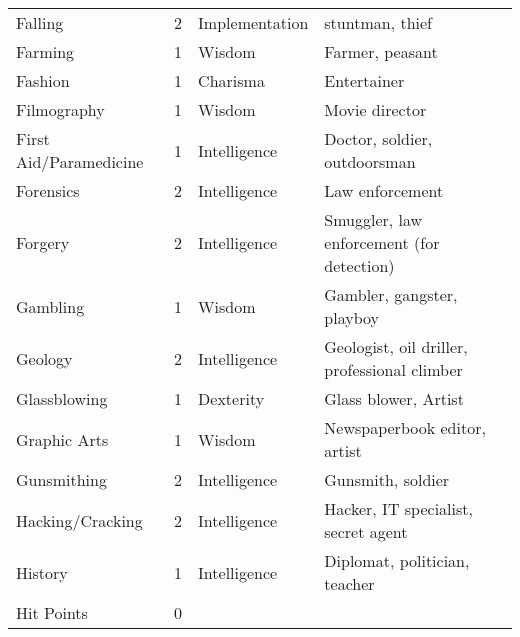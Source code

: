 \documentclass[twoside]{book}
\begin{document}
\begin{longtable}{p{1.25in}llp{12em}}
  \tabularnewline
      
  \raggedright
           Falling 
  &
   2 
  &
   Implementation 
  &
   stuntman, thief 
  \tabularnewline
      
  \raggedright
           Farming 
  &
   1 
  &
   Wisdom 
  &
   Farmer, peasant 
  \tabularnewline
      
  \raggedright
           Fashion 
  &
   1 
  &
   Charisma 
  &
   Entertainer 
  \tabularnewline
      
  \raggedright
           Filmography 
  &
   1 
  &
   Wisdom 
  &
   Movie director 
  \tabularnewline
      
  \raggedright
           First Aid/Paramedicine 
  &
   1 
  &
   Intelligence 
  &
   Doctor, soldier,
           outdoorsman 
  \tabularnewline
      
  \raggedright
           Forensics 
  &
   2 
  &
   Intelligence 
  &
   Law enforcement 
  \tabularnewline
      
  \raggedright
           Forgery 
  &
   2 
  &
   Intelligence 
  &
   Smuggler, law enforcement
           (for detection) 
  \tabularnewline
      
  \raggedright
           Gambling 
  &
   1 
  &
   Wisdom 
  &
   Gambler, gangster,
           playboy 
  \tabularnewline
      
  \raggedright
           Geology 
  &
   2 
  &
   Intelligence 
  &
   Geologist, oil driller,
           professional climber 
  \tabularnewline
      
  \raggedright
           Glassblowing 
  &
   1 
  &
   Dexterity 
  &
   Glass blower, Artist
           
  \tabularnewline
      
  \raggedright
           Graphic Arts 
  &
   1 
  &
   Wisdom 
  &
   Newspaperbook
           editor, artist 
  \tabularnewline
      
  \raggedright
           Gunsmithing 
  &
   2 
  &
   Intelligence 
  &
   Gunsmith, soldier
           
  \tabularnewline
      
  \raggedright
           Hacking/Cracking 
  &
   2 
  &
   Intelligence 
  &
   Hacker, IT specialist,
           secret agent 
  \tabularnewline
      
  \raggedright
           History 
  &
   1 
  &
   Intelligence 
  &
   Diplomat, politician,
           teacher 
  \tabularnewline
      
  \raggedright
           Hit Points 
  &
   0 
  &
  

\end{longtable}
\end{document}
